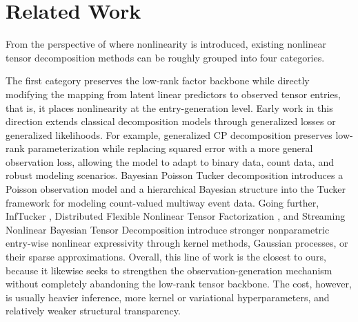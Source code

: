 \section{Related Work}
\label{sec:related}

From the perspective of where nonlinearity is introduced, existing nonlinear tensor decomposition methods can be roughly grouped into four categories.

The first category preserves the low-rank factor backbone while directly modifying the mapping from latent linear predictors to observed tensor entries, that is, it places nonlinearity at the entry-generation level. Early work in this direction extends classical decomposition models through generalized losses or generalized likelihoods. For example, generalized CP decomposition \cite{hong2020generalized} preserves low-rank parameterization while replacing squared error with a more general observation loss, allowing the model to adapt to binary data, count data, and robust modeling scenarios. Bayesian Poisson Tucker decomposition \cite{schein2016bayesian} introduces a Poisson observation model and a hierarchical Bayesian structure into the Tucker framework for modeling count-valued multiway event data. Going further, InfTucker \cite{xu2011infinite}, Distributed Flexible Nonlinear Tensor Factorization \cite{zhe2016distributed}, and Streaming Nonlinear Bayesian Tensor Decomposition \cite{pan2020streaming} introduce stronger nonparametric entry-wise nonlinear expressivity through kernel methods, Gaussian processes, or their sparse approximations. Overall, this line of work is the closest to ours, because it likewise seeks to strengthen the observation-generation mechanism without completely abandoning the low-rank tensor backbone. The cost, however, is usually heavier inference, more kernel or variational hyperparameters, and relatively weaker structural transparency.

